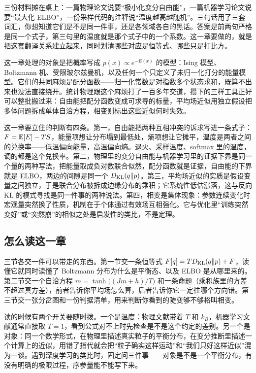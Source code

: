 三份材料摊在桌上：一篇物理论文说要``极小化变分自由能''，一篇机器学习论文说要``最大化 ELBO''，一份采样代码的注释说``温度越高越随机''。三句话用了三套词汇，你想知道它们是不是同一件事，还是各领域各自的黑话。答案是前两句严格是同一个式子，第三句里的温度就是那个式子中的一个系数。这一章要做的，就是把这套翻译关系建立起来，同时划清哪些对应是恒等式、哪些只是打比方。

这一章处理的对象是把概率写成 \(p(x)\propto e^{-E(x)}\) 的模型：Ising 模型、Boltzmann 机、受限玻尔兹曼机，以及任何一个只定义了未归一化打分的能量模型。它们的共同麻烦是配分函数——归一化常数是对指数多个状态求和，既算不出来也没法直接绕开。统计物理跟这个麻烦打了一百多年交道，攒下的三样工具正好可以整批搬过来：自由能把配分函数变成可求导的标量，平均场近似用独立假设把多体问题拆成单体自洽方程，相变则标出这些近似何时失效。

这一章要立住的判断有四条。第一，自由能把两种互相冲突的诉求写进一条式子：\(F=\mathbb{E}[E]-TS\)，能量项想让分布塌到最低处，熵项想让它摊平，温度是两者之间的兑换率——低温偏向能量，高温偏向熵。退火、采样温度、softmax 里的温度，调的都是这个兑换率。第二，物理里的变分自由能与机器学习里的证据下界是同一个量的两种写法，把能量取成负对数联合似然，配分函数就是证据，自由能的下界就是 ELBO，两边的间隙是同一个 \(D_{\mathrm{KL}}(q\|p)\)。第三，平均场近似的实质是假设变量之间独立，于是联合分布被拆成边缘分布的乘积；它系统性低估涨落，这与反向 KL 的模式寻找是同一件事的两种说法。第四，相变是集体现象：参数连续变化时宏观量突然换了性质，机制在于个体通过有效场互相强化。它与优化里``训练突然变好''或``突然崩''的相似之处是启发性的类比，不是定理。

\subsection{怎么读这一章}

三节各交一件可以带走的东西。第一节交一条恒等式 \(F[q]=TD_{\mathrm{KL}}(q\|p)+F\)，读懂它就同时读懂了 Boltzmann 分布为什么是平衡态、以及 ELBO 是从哪里来的。第二节交一个自洽方程 \(m=\tanh\bigl((Jm+h)/T\bigr)\) 和一条命题（乘积族里的方差不超过真方差），前者告诉你平均场怎么算，后者告诉你它一定往哪个方向错。第三节交一张分岔图和一份判据清单，用来判断你看到的陡变够不够格叫相变。

读的时候有两个开关要随时拨。一个是温度：物理文献带着 \(T\) 和 \(k_B\)，机器学习文献通常直接取 \(T=1\)，看到公式对不上时先检查是不是这个约定的差别。另一个是对象：同一个数学形式，在物理里描述真实粒子的平衡分布，在变分推断里描述一个计算上的近似，用错了指代就会把``粒子确实这样运动''和``我们只好这样近似''混为一谈。遇到深度学习的类比时，固定问三件事——对象是不是一个平衡分布，有没有明确的极限过程，序参量能不能写下来。

